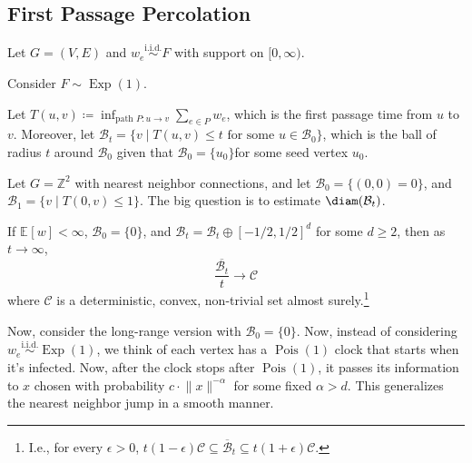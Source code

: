 \subsection{First Passage Percolation}
Let \(G = (V, E)\) and \(w_e \overset{\text{i.i.d.} }{\sim } F\) with support on \([0, \infty )\).

\begin{eg}
	Consider \(F \sim \operatorname{Exp}(1) \).
\end{eg}

Let \(T(u, v) \coloneqq \inf _{\text{path } P \colon u \to v} \sum_{e \in P } w_e\), which is the first passage time from \(u\) to \(v\). Moreover, let \(\mathcal{B} _t = \{ v \mid T(u, v) \leq t \text{ for some } u \in \mathcal{B} _0 \} \), which is the ball of radius \(t\) around \(\mathcal{B} _0\) given that \(\mathcal{B} _0 = \{ u_0 \} \)for some seed vertex \(u_0\).

\begin{eg}
	Let \(G = \mathbb{Z} ^2\) with nearest neighbor connections, and let \(\mathcal{B} _0 = \{ (0, 0) = 0 \} \), and \(\mathcal{B} _1 = \{ v \mid T(0, v) \leq 1 \} \). The big question is to estimate \(\diam (\mathcal{B} _t)\).
	\begin{center}
	\end{center}
\end{eg}

\begin{theorem}
	If \(\mathbb{E}_{}[w] < \infty \), \(\mathcal{B} _0 = \{ 0 \} \), and \(\mathcal{B} _t = \mathcal{B} _t \oplus [-1 / 2, 1 / 2]^d\) for some \(d \geq 2\), then as \(t \to \infty \),
	\[
		\frac{\overline{\mathcal{B} _t} }{t}
		\to \mathcal{C}
	\]
	where \(\mathcal{C} \) is a deterministic, convex, non-trivial set almost surely.\footnote{I.e., for every \(\epsilon > 0\), \(t(1 - \epsilon ) \mathcal{C} \subseteq \overline{\mathcal{B} } _t \subseteq t(1 + \epsilon ) \mathcal{C} \).}
\end{theorem}

Now, consider the long-range version with \(\mathcal{B} _0 = \{ 0 \} \). Now, instead of considering \(w_e \overset{\text{i.i.d.} }{\sim } \operatorname{Exp}(1) \), we think of each vertex has a \(\operatorname{Pois}(1) \) clock that starts when it's infected. Now, after the clock stops after \(\operatorname{Pois}(1) \), it passes its information to \(x\) chosen with probability \(c \cdot \lVert x \rVert ^{-\alpha }\) for some fixed \(\alpha > d\). This generalizes the nearest neighbor jump in a smooth manner.


